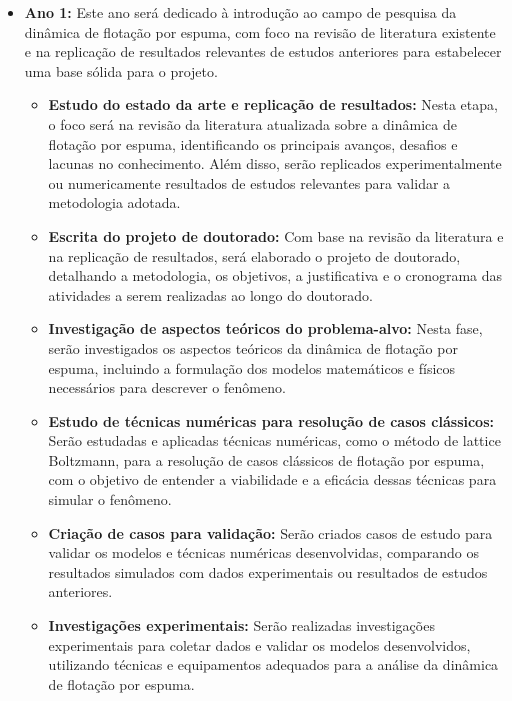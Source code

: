 \documentclass[12pt]{article}
\begin{document}
\begin{itemize}
\item \textbf{Ano 1:} Este ano será dedicado à introdução ao campo de pesquisa da dinâmica de flotação por espuma, com foco na revisão de literatura existente e na replicação de resultados relevantes de estudos anteriores para estabelecer uma base sólida para o projeto.
\begin{itemize}
    \item \textbf{Estudo do estado da arte e replicação de resultados:} Nesta etapa, o foco será na revisão da literatura atualizada sobre a dinâmica de flotação por espuma, identificando os principais avanços, desafios e lacunas no conhecimento. Além disso, serão replicados experimentalmente ou numericamente resultados de estudos relevantes para validar a metodologia adotada.
    
    \item \textbf{Escrita do projeto de doutorado:} Com base na revisão da literatura e na replicação de resultados, será elaborado o projeto de doutorado, detalhando a metodologia, os objetivos, a justificativa e o cronograma das atividades a serem realizadas ao longo do doutorado.
    
    \item \textbf{Investigação de aspectos teóricos do problema-alvo:} Nesta fase, serão investigados os aspectos teóricos da dinâmica de flotação por espuma, incluindo a formulação dos modelos matemáticos e físicos necessários para descrever o fenômeno.
    
    \item \textbf{Estudo de técnicas numéricas para resolução de casos clássicos:} Serão estudadas e aplicadas técnicas numéricas, como o método de lattice Boltzmann, para a resolução de casos clássicos de flotação por espuma, com o objetivo de entender a viabilidade e a eficácia dessas técnicas para simular o fenômeno.
    
    \item \textbf{Criação de casos para validação:} Serão criados casos de estudo para validar os modelos e técnicas numéricas desenvolvidas, comparando os resultados simulados com dados experimentais ou resultados de estudos anteriores.
    
    \item \textbf{Investigações experimentais:} Serão realizadas investigações experimentais para coletar dados e validar os modelos desenvolvidos, utilizando técnicas e equipamentos adequados para a análise da dinâmica de flotação por espuma.
    

\end{itemize}
\end{itemize}
\end{document}
